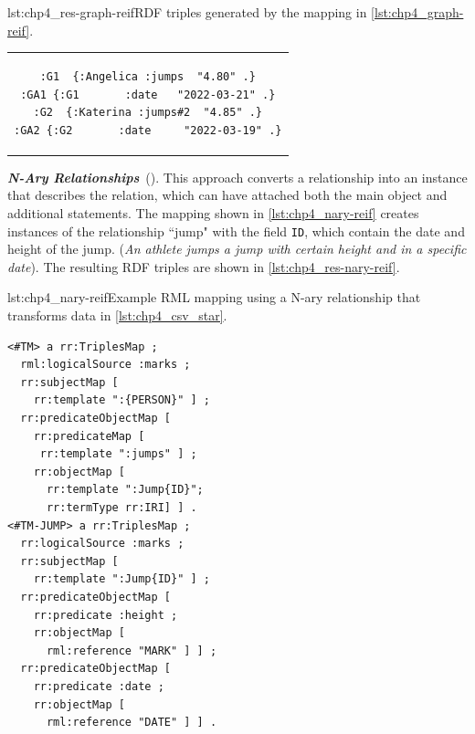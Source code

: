 \noindent\hspace{0.12\linewidth}\begin{minipage}{\linewidth}
\begin{captionedlisting}{lst:chp4_res-graph-reif}{RDF triples generated by the mapping in \cref{lst:chp4_graph-reif}.}
\centering
\begin{tabular}{c}
\hspace{4em}
{\begin{lstlisting}[basicstyle=\ttfamily\small,label={list:example1},columns=flexible]
:G1  {:Angelica :jumps  "4.80" .}
:GA1 {:G1       :date   "2022-03-21" .}
:G2  {:Katerina :jumps#2  "4.85" .}
:GA2 {:G2       :date     "2022-03-19" .}
\end{lstlisting}}
\end{tabular}
\end{captionedlisting}
\end{minipage}


\textit{\textbf{N-Ary Relationships}}~(\cite{naryw3c2006}). This approach  converts a relationship into an instance that describes the relation, which can have attached both the main object and additional statements. The mapping shown in \cref{lst:chp4_nary-reif} creates instances of the relationship ``jump" with the field \texttt{ID}, which contain the date and height of the jump.  (\textit{An athlete jumps a jump with certain height and in a specific date}). 
The resulting RDF triples are shown in \cref{lst:chp4_res-nary-reif}.

\begin{minipage}{\linewidth}
\begin{captionedlisting}{lst:chp4_nary-reif}{Example RML mapping using a N-ary relationship that transforms data in \cref{lst:chp4_csv_star}.}
\centering
\begin{multicols}{2}
{\begin{lstlisting}[basicstyle=\ttfamily\small,label={list:example1},columns=flexible]
<#TM> a rr:TriplesMap ;
  rml:logicalSource :marks ;
  rr:subjectMap [ 
    rr:template ":{PERSON}" ] ;
  rr:predicateObjectMap [ 
    rr:predicateMap [
     rr:template ":jumps" ] ;
    rr:objectMap [
      rr:template ":Jump{ID}";
      rr:termType rr:IRI] ] .
<#TM-JUMP> a rr:TriplesMap ;
  rr:logicalSource :marks ;
  rr:subjectMap [ 
    rr:template ":Jump{ID}" ] ;
  rr:predicateObjectMap [ 
    rr:predicate :height ;
    rr:objectMap [
      rml:reference "MARK" ] ] ;
  rr:predicateObjectMap [ 
    rr:predicate :date ;
    rr:objectMap [
      rml:reference "DATE" ] ] .
\end{lstlisting}}
\end{multicols}
\end{captionedlisting}
\end{minipage}

